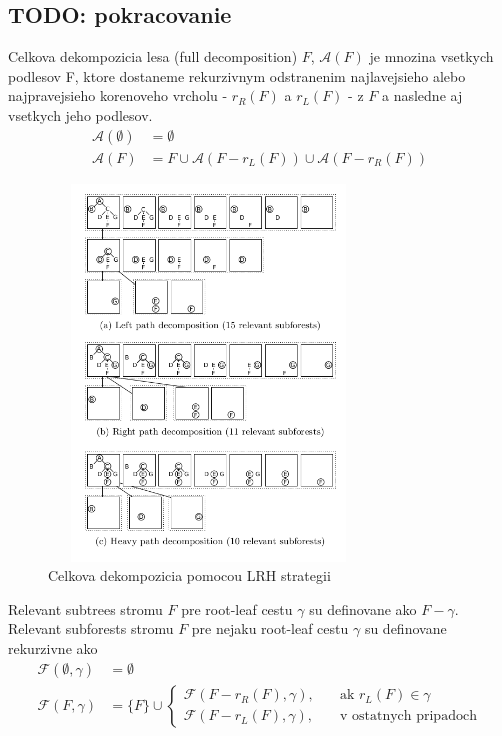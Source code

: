 \subsection{TODO: pokracovanie} %

\begin{definice}
	Celkova dekompozicia lesa (full decomposition) $F$, $\mathcal{A}(F)$ je mnozina
	vsetkych podlesov F, ktore dostaneme rekurzivnym odstranenim najlavejsieho
	alebo najpravejsieho korenoveho vrcholu - $r_{R}(F)$ a $r_{L}(F)$ - z $F$
	a nasledne aj vsetkych jeho podlesov.
	\begin{align*}
		\mathcal{A}(\emptyset) &= \emptyset
		\\
		\mathcal{A}(F) &= {F} \cup \mathcal{A}(F - r_{L}(F)) \cup \mathcal{A}(F - r_{R}(F))
	\end{align*}
\end{definice}

\begin{figure}[H]
\centering
\includegraphics[width=85mm, height=100mm]{../img/LRH_decomposition.png}
\caption{Celkova dekompozicia pomocou LRH strategii}
\label{obr:LRH_decomposition}
\end{figure}

\begin{definice}
	Relevant subtrees stromu $F$ pre root-leaf cestu $\gamma$ su definovane ako $F - \gamma$.
	Relevant subforests stromu $F$ pre nejaku root-leaf cestu $\gamma$ su definovane rekurzivne ako
	\begin{align*}
    \mathcal{F}(\emptyset, \gamma) &= \emptyset
		\\
		\mathcal{F}(F, \gamma) &= \{F\} \cup
		\begin{cases}
      \mathcal{F}(F - r_{R}(F), \gamma), \quad{} &\text{ak $r_{L}(F) \in \gamma$}
			\\
      \mathcal{F}(F - r_{L}(F), \gamma), &\text{v ostatnych pripadoch}
		\end{cases}
	\end{align*}
\end{definice}

